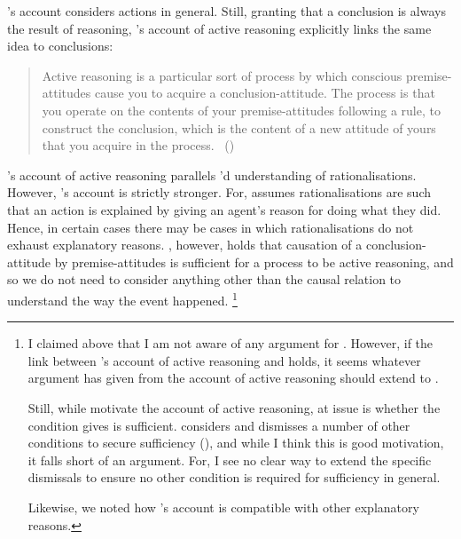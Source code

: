 \begin{note}
  \citeauthor{Davidson:1963aa}'s account considers actions in general.
  Still, granting that a conclusion is always the result of reasoning, \citeauthor{Broome:2013aa}'s account of active reasoning explicitly links the same idea to conclusions:
  \begin{quote}
    Active reasoning is a particular sort of process by which conscious premise-attitudes cause you to acquire a conclusion-attitude.
    The process is that you operate on the contents of your premise-attitudes following a rule, to construct the conclusion, which is the content of a new attitude of yours that you acquire in the process.%
    \mbox{ }\hfill\mbox{(\citeyear[234]{Broome:2013aa})}
  \end{quote}

  \citeauthor{Broome:2019aa}'s account of active reasoning parallels \citeauthor{Davidson:1963aa}'d understanding of rationalisations.
  However, \citeauthor{Broome:2019aa}'s account is strictly stronger.
  For, \citeauthor{Davidson:1963aa} assumes rationalisations are such that an action is explained by giving an agent's reason for doing what they did.
  Hence, in certain cases there may be cases in which rationalisations do not exhaust explanatory reasons.
  \citeauthor{Broome:2019aa}, however, holds that causation of a conclusion-attitude by premise-attitudes is sufficient for a process to be active reasoning, and so we do not need to consider anything other than the causal relation to understand the way the event happened.%
  \footnote{
    I claimed above that I am not aware of any argument for \issueInclusion{}.
    However, if the link between \citeauthor{Broome:2013aa}'s account of active reasoning and \issueInclusion{} holds, it seems whatever argument \citeauthor{Broome:2013aa} has given from the account of active reasoning should extend to \issueInclusion{}.

    Still, while \citeauthor{Broome:2013aa} motivate the account of active reasoning, at issue is whether the condition \citeauthor{Broome:2013aa} gives is sufficient.
    \citeauthor{Broome:2013aa} considers and dismisses a number of other conditions to secure sufficiency
    (\citeyear[cf.][\S13.2]{Broome:2013aa}), and while I think this is good motivation, it falls short of an argument.
    For, I see no clear way to extend the specific dismissals to ensure no other condition is required for sufficiency in general.

    Likewise, we noted how \citeauthor{Davidson:1963aa}'s account is compatible with other explanatory reasons.
  }
\end{note}

